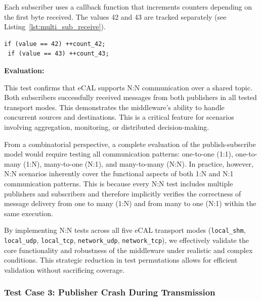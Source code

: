 Each subscriber uses a callback function that increments counters depending on the first byte received. The values 42 and 43 are tracked separately (see Listing~\ref{lst:multi_sub_receive}).
\vspace{0.5em}
\begin{lstlisting}[style=cppstyle, caption={Subscriber callback counting 42 and 43}, label={lst:multi_sub_receive}, captionpos=b]
 if (value == 42) ++count_42;
 if (value == 43) ++count_43;
\end{lstlisting}

\vspace{0.5em}
\textbf{Evaluation:}

\vspace{0.4em}
This test confirms that eCAL supports N:N communication over a shared topic. Both subscribers successfully received messages from both publishers in all tested transport modes. This demonstrates the middleware's ability to handle concurrent sources and destinations. This is a critical feature for scenarios involving aggregation, monitoring, or distributed decision-making.

\vspace{1em}
From a combinatorial perspective, a complete evaluation of the publish-subscribe model would require testing all communication patterns: one-to-one (1:1), one-to-many (1:N), many-to-one (N:1), and many-to-many (N:N). In practice, however, N:N scenarios inherently cover the functional aspects of both 1:N and N:1 communication patterns. This is because every N:N test includes multiple publishers and subscribers and therefore implicitly verifies the correctness of message delivery from one to many (1:N) and from many to one (N:1) within the same execution.

\vspace{1em}
By implementing N:N tests across all five eCAL transport modes (\texttt{local\_shm}, \texttt{local\_udp}, \texttt{local\_tcp}, \texttt{network\_udp}, \texttt{network\_tcp}), we effectively validate the core functionality and robustness of the middleware under realistic and complex conditions. This strategic reduction in test permutations allows for efficient validation without sacrificing coverage.

\vspace{1em}
\vspace{1em}
\subsubsection{Test Case 3: Publisher Crash During Transmission}

